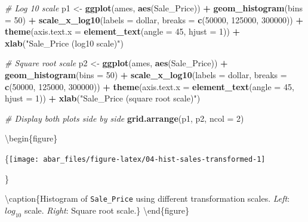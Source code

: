\documentclass[]{book}
\newenvironment{Shaded}{\begin{snugshade}}{\end{snugshade}}
\newcommand{\CommentTok}[1]{\textcolor[rgb]{0.56,0.35,0.01}{\textit{#1}}}
\newcommand{\DataTypeTok}[1]{\textcolor[rgb]{0.13,0.29,0.53}{#1}}
\newcommand{\DecValTok}[1]{\textcolor[rgb]{0.00,0.00,0.81}{#1}}
\newcommand{\KeywordTok}[1]{\textcolor[rgb]{0.13,0.29,0.53}{\textbf{#1}}}
\newcommand{\NormalTok}[1]{#1}
\newcommand{\OperatorTok}[1]{\textcolor[rgb]{0.81,0.36,0.00}{\textbf{#1}}}
\newcommand{\StringTok}[1]{\textcolor[rgb]{0.31,0.60,0.02}{#1}}
\theoremstyle{definition}
\theoremstyle{definition}
\theoremstyle{definition}
\theoremstyle{remark}
\begin{document}
\begin{Shaded}
\begin{Highlighting}[]
\CommentTok{# Log 10 scale}
\NormalTok{p1 <-}\StringTok{ }\KeywordTok{ggplot}\NormalTok{(ames, }\KeywordTok{aes}\NormalTok{(Sale_Price)) }\OperatorTok{+}
\StringTok{  }\KeywordTok{geom_histogram}\NormalTok{(}\DataTypeTok{bins =} \DecValTok{50}\NormalTok{) }\OperatorTok{+}
\StringTok{  }\KeywordTok{scale_x_log10}\NormalTok{(}\DataTypeTok{labels =}\NormalTok{ dollar, }\DataTypeTok{breaks =} \KeywordTok{c}\NormalTok{(}\DecValTok{50000}\NormalTok{, }\DecValTok{125000}\NormalTok{, }\DecValTok{300000}\NormalTok{)) }\OperatorTok{+}
\StringTok{  }\KeywordTok{theme}\NormalTok{(}\DataTypeTok{axis.text.x =} \KeywordTok{element_text}\NormalTok{(}\DataTypeTok{angle =} \DecValTok{45}\NormalTok{, }\DataTypeTok{hjust =} \DecValTok{1}\NormalTok{)) }\OperatorTok{+}
\StringTok{  }\KeywordTok{xlab}\NormalTok{(}\StringTok{"Sale_Price (log10 scale)"}\NormalTok{)}

\CommentTok{# Square root scale}
\NormalTok{p2 <-}\StringTok{ }\KeywordTok{ggplot}\NormalTok{(ames, }\KeywordTok{aes}\NormalTok{(Sale_Price)) }\OperatorTok{+}
\StringTok{  }\KeywordTok{geom_histogram}\NormalTok{(}\DataTypeTok{bins =} \DecValTok{50}\NormalTok{) }\OperatorTok{+}
\StringTok{  }\KeywordTok{scale_x_log10}\NormalTok{(}\DataTypeTok{labels =}\NormalTok{ dollar, }\DataTypeTok{breaks =} \KeywordTok{c}\NormalTok{(}\DecValTok{50000}\NormalTok{, }\DecValTok{125000}\NormalTok{, }\DecValTok{300000}\NormalTok{)) }\OperatorTok{+}
\StringTok{  }\KeywordTok{theme}\NormalTok{(}\DataTypeTok{axis.text.x =} \KeywordTok{element_text}\NormalTok{(}\DataTypeTok{angle =} \DecValTok{45}\NormalTok{, }\DataTypeTok{hjust =} \DecValTok{1}\NormalTok{)) }\OperatorTok{+}
\StringTok{  }\KeywordTok{xlab}\NormalTok{(}\StringTok{"Sale_Price (square root scale)"}\NormalTok{)}

\CommentTok{# Display both plots side by side}
\KeywordTok{grid.arrange}\NormalTok{(p1, p2, }\DataTypeTok{ncol =} \DecValTok{2}\NormalTok{)}
\end{Highlighting}
\end{Shaded}

\textbackslash{}begin\{figure\}

\{\centering \texttt{[image: abar\_files/figure-latex/04-hist-sales-transformed-1]}

\}

\textbackslash{}caption\{Histogram of \texttt{Sale\_Price} using
different transformation scales. \emph{Left}: \(log_{10}\) scale.
\emph{Right}: Square root scale.\}\label{fig:04-hist-sales-transformed}
\textbackslash{}end\{figure\}
\end{document}
